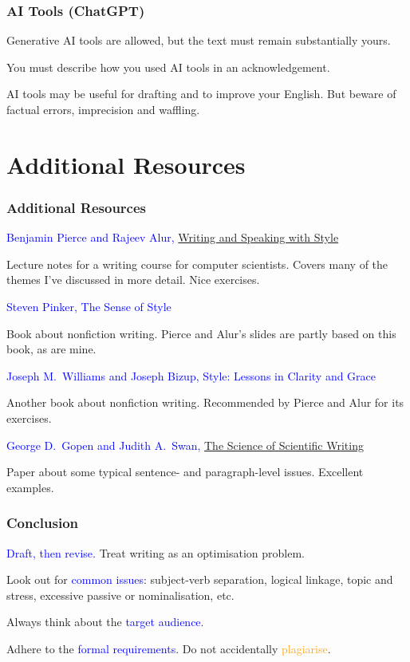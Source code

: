 \documentclass[xetex]{beamer}
\newcommand{\bad}[1]{\textcolor{orange}{#1}}
\newcommand{\good}[1]{\textcolor{blue}{#1}}
\begin{document}
\begin{frame}
  \frametitle{AI Tools (ChatGPT)}

  Generative AI tools are allowed, but the text must remain substantially yours.

  \medskip
  \pause

  You must describe how you used AI tools in an acknowledgement.

  \medskip
  \pause

  AI tools may be useful for drafting and to improve your English.
  But beware of factual errors, imprecision and waffling.
\end{frame}

\section{Additional Resources}

\begin{frame}
  \frametitle{Additional Resources}

  \small

  \good{Benjamin Pierce and Rajeev Alur, \href{https://docs.google.com/document/d/1_vBXbugoLjO171w3wovs3ugmRQI-O6EcSVFDBF7eUzE/edit}{Writing and Speaking with Style}}

  Lecture notes for a writing course for computer scientists.
  Covers many of the themes I've discussed in more detail.
  Nice exercises.

  \medskip

  \good{Steven Pinker, The Sense of Style}

  Book about nonfiction writing.
  Pierce and Alur's slides are partly based on this book, as are mine.

  \medskip

  \good{Joseph M.\ Williams and Joseph Bizup, Style: Lessons in Clarity and Grace}

  Another book about nonfiction writing.
  Recommended by Pierce and Alur for its exercises.

  \medskip

  \good{George D.\ Gopen and Judith A.\ Swan, \href{https://pages.ucsd.edu/~scoulson/101b/Science-of-Writing.pdf}{The Science of Scientific Writing}}

  Paper about some typical sentence- and paragraph-level issues.
  Excellent examples.
\end{frame}

\begin{frame}
  \frametitle{Conclusion}

  \good{Draft, then revise.} Treat writing as an optimisation problem.

  \medskip
  \pause

  Look out for \good{common issues}: subject-verb separation, logical linkage, topic and stress, excessive passive or nominalisation, etc.

  \medskip
  \pause

  Always think about the \good{target audience}.

  \medskip
  \pause

  Adhere to the \good{formal requirements}. Do not accidentally \bad{plagiarise}.
\end{frame}
\end{document}
